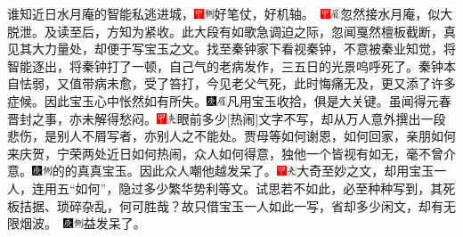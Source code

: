 谁知近日水月庵的智能私逃进城，{\includegraphics[width=3mm]{../Images/00002}\includegraphics[width=3mm]{../Images/00011}\footnotesize \kaishu 好笔仗，好机轴。　\includegraphics[width=3mm]{../Images/00002}\includegraphics[width=3mm]{../Images/00010}\footnotesize \kaishu 忽然接水月庵，似大脱泄。及读至后，方知为紧收。此大段有如歌急调迫之际，忽闻戛然檀板截断，真见其大力量处，却便于写宝玉之文。}找至秦钟家下看视秦钟，不意被秦业知觉，将智能逐出，将秦钟打了一顿，自己气的老病发作，三五日的光景呜呼死了。秦钟本自怯弱，又值带病未愈，受了笞打，今见老父气死，此时悔痛无及，更又添了许多症候。因此宝玉心中怅然如有所失。{\includegraphics[width=3mm]{../Images/00004}\includegraphics[width=3mm]{../Images/00010}\footnotesize \kaishu 凡用宝玉收拾，俱是大关键。}虽闻得元春晋封之事，亦未解得愁闷。{\includegraphics[width=3mm]{../Images/00002}\includegraphics[width=3mm]{../Images/00012}\footnotesize \kaishu 眼前多少{[}热闹{]}文字不写，却从万人意外撰出一段悲伤，是别人不屑写者，亦别人之不能处。}贾母等如何谢恩，如何回家，亲朋如何来庆贺，宁荣两处近日如何热闹，众人如何得意，独他一个皆视有如无，毫不曾介意。{\includegraphics[width=3mm]{../Images/00004}\includegraphics[width=3mm]{../Images/00011}\footnotesize \kaishu 的的真真宝玉。}因此众人嘲他越发呆了。{\includegraphics[width=3mm]{../Images/00002}\includegraphics[width=3mm]{../Images/00012}\footnotesize \kaishu 大奇至妙之文，却用宝玉一人，连用五``如何''，隐过多少繁华势利等文。试思若不如此，必至种种写到，其死板拮据、琐碎杂乱，何可胜哉？故只借宝玉一人如此一写，省却多少闲文，却有无限烟波。　\includegraphics[width=3mm]{../Images/00004}\includegraphics[width=3mm]{../Images/00011}\footnotesize \kaishu 益发呆了。}

